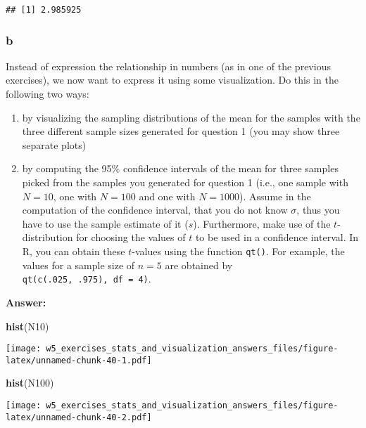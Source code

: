 \documentclass[]{article}
\newenvironment{Shaded}{\begin{snugshade}}{\end{snugshade}}
\newcommand{\KeywordTok}[1]{\textcolor[rgb]{0.13,0.29,0.53}{\textbf{#1}}}
\newcommand{\NormalTok}[1]{#1}
\providecommand{\tightlist}{%
  \setlength{\itemsep}{0pt}\setlength{\parskip}{0pt}}
\begin{document}
\begin{verbatim}
## [1] 2.985925
\end{verbatim}

\hypertarget{b-6}{%
\subsubsection{b}\label{b-6}}

Instead of expression the relationship in numbers (as in one of the
previous exercises), we now want to express it using some visualization.
Do this in the following two ways:

\begin{enumerate}
\def\labelenumi{\alph{enumi})}
\tightlist
\item
  by visualizing the sampling distributions of the mean for the samples
  with the three different sample sizes generated for question 1 (you
  may show three separate plots)
\item
  by computing the 95\(\%\) confidence intervals of the mean for three
  samples picked from the samples you generated for question 1 (i.e.,
  one sample with \(N = 10\), one with \(N = 100\) and one with
  \(N = 1000\)). Assume in the computation of the confidence interval,
  that you do not know \(\sigma\), thus you have to use the sample
  estimate of it (\(s\)). Furthermore, make use of the
  \(t\)-distribution for choosing the values of \(t\) to be used in a
  confidence interval. In R, you can obtain these \(t\)-values using the
  function \texttt{qt()}. For example, the values for a sample size of
  \(n = 5\) are obtained by \texttt{qt(c(.025,\ .975),\ df\ =\ 4)}.
\end{enumerate}

\textbf{Answer:}

\begin{Shaded}
\begin{Highlighting}[]
\KeywordTok{hist}\NormalTok{(N10)}
\end{Highlighting}
\end{Shaded}

\texttt{[image: w5\_exercises\_stats\_and\_visualization\_answers\_files/figure-latex/unnamed-chunk-40-1.pdf]}

\begin{Shaded}
\begin{Highlighting}[]
\KeywordTok{hist}\NormalTok{(N100)}
\end{Highlighting}
\end{Shaded}

\texttt{[image: w5\_exercises\_stats\_and\_visualization\_answers\_files/figure-latex/unnamed-chunk-40-2.pdf]}
\end{document}
